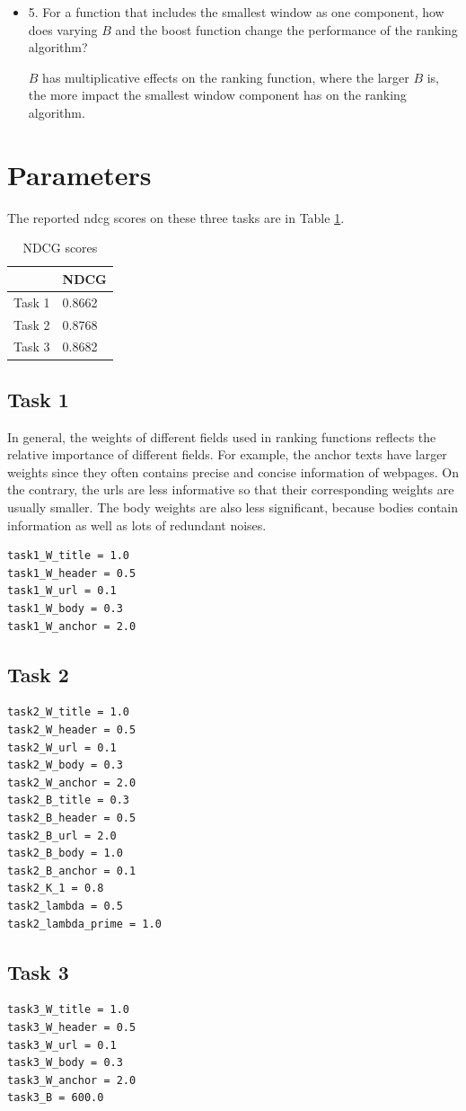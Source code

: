 \begin{itemize}
  \item[] 5. For a function that includes the smallest window as one component, how does varying $B$ and the boost function change the performance of the ranking algorithm?

      $B$ has multiplicative effects on the ranking function, where the larger $B$ is, the more impact the smallest window component has on the ranking algorithm.
\end{itemize}

\section{Parameters}
The reported ndcg scores on these three tasks are in Table \ref{tab:ndcg}.
\begin{table}
\begin{center}
\begin{tabular}{|l|l|}
  \hline
   & NDCG \\
  \hline
  Task 1 & 0.8662 \\
  Task 2 & 0.8768 \\
  Task 3 & 0.8682 \\
  \hline
\end{tabular}
  \caption{NDCG scores}\label{tab:ndcg}
\end{center}
\end{table}

\subsection{Task 1}
In general, the weights of different fields used in ranking functions reflects the relative importance of different fields.
For example, the anchor texts have larger weights since they often contains precise and concise information of webpages.
On the contrary, the urls are less informative so that their corresponding weights are usually smaller.
The body weights are also less significant, because bodies contain information as well as lots of redundant noises.
\begin{verbatim}
task1_W_title = 1.0
task1_W_header = 0.5
task1_W_url = 0.1
task1_W_body = 0.3
task1_W_anchor = 2.0
\end{verbatim}

\subsection{Task 2}
\begin{verbatim}
task2_W_title = 1.0
task2_W_header = 0.5
task2_W_url = 0.1
task2_W_body = 0.3
task2_W_anchor = 2.0
task2_B_title = 0.3
task2_B_header = 0.5
task2_B_url = 2.0
task2_B_body = 1.0
task2_B_anchor = 0.1
task2_K_1 = 0.8
task2_lambda = 0.5
task2_lambda_prime = 1.0
\end{verbatim}


\subsection{Task 3}
\begin{verbatim}
task3_W_title = 1.0
task3_W_header = 0.5
task3_W_url = 0.1
task3_W_body = 0.3
task3_W_anchor = 2.0
task3_B = 600.0
\end{verbatim}




